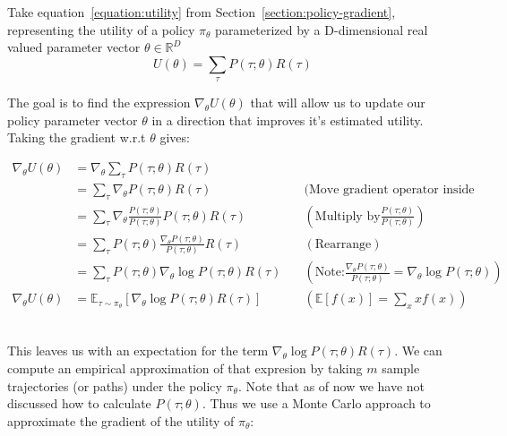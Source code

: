 \documentclass{../main.tex}{subfiles}
\begin{document}
Take equation~\ref{equation:utility} from Section~\ref{section:policy-gradient}, representing the utility of a policy $\pi_{\theta}$ parameterized by a D-dimensional real valued parameter vector $\theta \in \mathbb{R}^D$
\begin{equation}
U(\theta) = \sum_{\tau}P(\tau ; \theta) R(\tau)
\end{equation}

The goal is to find the expression $\nabla_{\theta} U(\theta)$ that will allow us to update our policy parameter vector $\theta$ in a direction that improves it's estimated utility. Taking the gradient w.r.t $\theta$ gives:

\begin{equation}\label{equation:approximate-gradient}
\begin{aligned}
\nabla_{\theta} U(\theta) & = \nabla_{\theta} \sum_{\tau}P(\tau ; \theta) R(\tau) \\
& =  \sum_{\tau} \nabla_{\theta} P(\tau ; \theta) R(\tau) \quad &\text{(Move gradient operator inside sum)} \\
& =  \sum_{\tau} \nabla_{\theta} \frac{P(\tau; \theta)}{P(\tau ; \theta)} P(\tau ; \theta) R(\tau) \quad & (\text{Multiply by} \frac{P(\tau; \theta)}{P(\tau ; \theta)}  )  \\
& =  \sum_{\tau} P(\tau; \theta) \frac{\nabla_{\theta} P(\tau ; \theta)}{P(\tau ; \theta)} R(\tau) \quad & (\text{Rearrange}) \\
& =  \sum_{\tau} P(\tau; \theta) \nabla_{\theta} \log P(\tau ; \theta) R(\tau) \quad & (\text{Note:} \frac{\nabla_{\theta}P(\tau; \theta)}{P(\tau; \theta)} = \nabla_{\theta} \log P(\tau; \theta) ) \\
\nabla_{\theta} U(\theta) & = \mathbb{E}_{\tau \sim \pi_{\theta}} [\nabla_{\theta} \log P(\tau ; \theta) R(\tau)] & (\mathbb{E}[f(x)] = \sum_{x} xf(x))\\
\end{aligned}
\end{equation}

\begin{equation}
\end{equation}

This leaves us with an expectation for the term $\nabla_{\theta} \log P(\tau ; \theta) R(\tau)$. We can compute an empirical approximation of that expresion by taking $m$ sample trajectories (or paths) under the policy $\pi_{\theta}$. Note that as of now we have not discussed how to calculate $P(\tau ; \theta)$. Thus we use a Monte Carlo approach to approximate the gradient of the utility of $\pi_{\theta}$:
\end{document}
